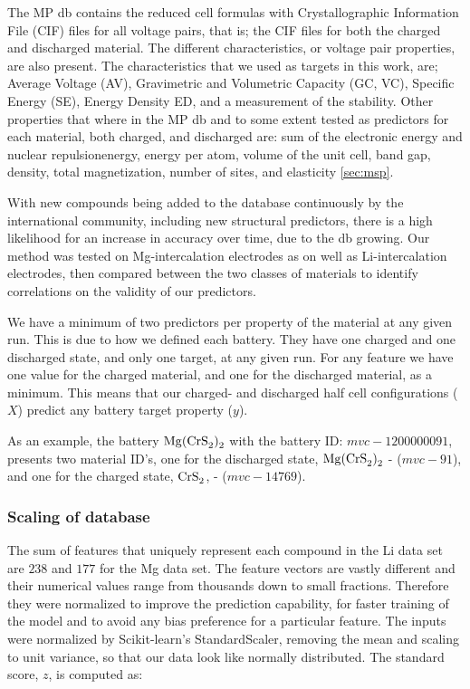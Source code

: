 	 The MP db contains the reduced cell formulas with Crystallographic Information File (\ac{CIF}) files for all voltage pairs, that is; the CIF files for both the charged and discharged material. The different characteristics, or voltage pair properties, are also present. The characteristics that we used as targets in this work, are; Average Voltage (\ac{AV}), Gravimetric and Volumetric Capacity (\ac{GC}, \ac{VC}), Specific Energy (\ac{SE}), Energy Density \ac{ED}, and a measurement of the stability. Other properties that where in the MP db and to some extent tested as predictors for each material, both charged, and discharged are: sum of the electronic energy and nuclear repulsionenergy, energy per atom, volume of the unit cell, band gap, density, total magnetization, number of sites, and elasticity \ref{sec:msp}. 

	With new compounds being added to the database continuously by the international community, including new structural predictors, there is a high likelihood for an increase in accuracy over time, due to the db growing. Our method was tested on Mg-intercalation electrodes as on well as Li-intercalation electrodes, then compared between the two classes of materials to identify correlations on the validity of our predictors. 

	We have a minimum of two predictors per property of the material at any given run. This is due to how we defined each battery. They have one charged and one discharged state, and only one target, at any given run. For any feature we have one value for the charged material, and one for the discharged material, as a minimum. This means that our charged- and discharged half cell configurations ($X$) predict any battery target property ($y$).

	As an example, the battery $\ce{Mg(CrS_2)_2}$ with the battery ID: $mvc-1200000091$, presents two material ID's, one for the discharged state, $\ce{Mg(CrS_2)_2}$ - ($mvc-91$), and one for the charged state, $\ce{CrS_2}$, - ($mvc-14769$).
		
	\subsubsection{Scaling of database}
	The sum of features that uniquely represent each compound in the Li data set are $238$ and $177$ for the Mg data set. The feature vectors are vastly different and their numerical values range from thousands down to small fractions. Therefore they were normalized to improve the prediction capability, for faster training of the model and to avoid any bias preference for a particular feature. The inputs were normalized by Scikit-learn's StandardScaler, removing the mean and scaling to unit variance, so that our data look like normally distributed. The standard score, $z$, is computed as:
	
